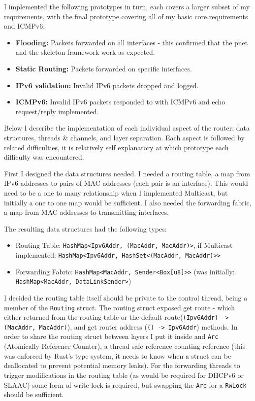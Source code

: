 \documentclass[12pt,a4paper,twoside,openany]{report}
\begin{document}
\bigskip

I implemented the following prototypes in turn, each covers a larger subset of my requirements, with the final prototype covering all of my basic core requirements and ICMPv6:
\begin{itemize}
\item \textbf{Flooding:} Packets forwarded on all interfaces - this confirmed that the pnet and the skeleton framework work as expected.
\item \textbf{Static Routing:} Packets forwarded on specific interfaces.
\item \textbf{IPv6 validation:} Invalid IPv6 packets dropped and logged.
\item \textbf{ICMPv6:} Invalid IPv6 packets responded to with ICMPv6 and echo request/reply implemented.
\end{itemize}
Below I describe the implementation of each individual aspect of the router: data structures, threads \& channels, and layer separation.  Each aspect is followed by related difficulties, it is relatively self explanatory at which prototype each difficulty was encountered.

\bigskip

First I designed the data structures needed.  I needed a routing table, a map from IPv6 addresses to pairs of MAC addresses (each pair is an interface). This would need to be a one to many relationship when I implemented Multicast, but initially a one to one map would be sufficient.  I also needed the forwarding fabric, a map from MAC addresses to transmitting interfaces.

The resulting data structures had the following types:
\begin{itemize}
\item Routing Table: \verb!HashMap<Ipv6Addr, (MacAddr, MacAddr)>!, if Multicast implemented: \verb!HashMap<Ipv6Addr, HashSet<(MacAddr, MacAddr)>>!
\item Forwarding Fabric: \verb!HashMap<MacAddr, Sender<Box[u8]>>! (was initially: \verb!HashMap<MacAddr, DataLinkSender>!)
\end{itemize}
I decided the routing table itself should be private to the control thread, being a member of the \verb!Routing! struct.  The routing struct exposed get route - which either returned from the routing table or the default route(\verb!(Ipv6Addr) -> (MacAddr, MacAddr)!), and get router address (\verb!() -> Ipv6Addr!) methods. In order to share the routing struct between layers I put it inside and \verb!Arc! (Atomically Reference Counter\cite{rust_arc}), a thread safe reference counting reference (this was enforced by Rust's type system, it needs to know when a struct can be deallocated to prevent potential memory leaks).  For the forwarding threads to trigger modifications in the routing table (as would be required for DHCPv6 or SLAAC) some form of write lock is required, but swapping the \verb!Arc! for a \verb!RwLock!\cite{rust_rwlock} should be sufficient.
\end{document}
